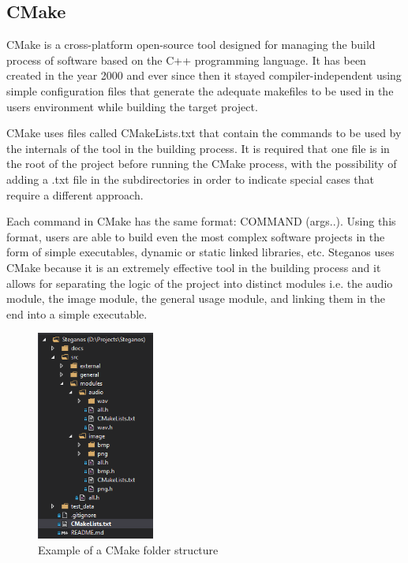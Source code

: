 \begin{multicols*}{2}
\subsection{CMake}
CMake is a cross-platform open-source tool designed for managing the build process of software based on the C++ programming language. It has been created in the year 2000 and ever since then it stayed compiler-independent using simple configuration files that generate the adequate makefiles to be used in the users environment while building the target project\cite{cmake-documentation}.

CMake uses files called CMakeLists.txt that contain the commands to be used by the internals of the tool in the building process. It is required that one file is in the root of the project before running the CMake process, with the possibility of adding a .txt file in the subdirectories in order to indicate special cases that require a different approach.



Each command in CMake has the same format: COMMAND (args..). Using this format, users are able to build even the most complex software projects in the form of simple executables, dynamic or static linked libraries, etc. Steganos uses CMake because it is an extremely effective tool in the building process and it allows for separating the logic of the project into distinct modules i.e. the audio module, the image module, the general usage module, and linking them in the end into a simple executable.

\begin{figure}[H]
    \centering
    \includegraphics[height=6.9cm,keepaspectratio]{pics/cmake_folder_structure_example}
    \caption{Example of a CMake folder structure}
\end{figure}


\end{multicols*}
